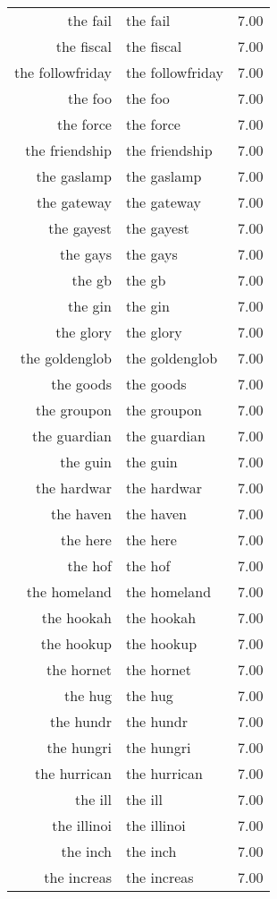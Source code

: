 \begin{table}[ht]
\begin{tabular}{rlr}
  the fail & the fail & 7.00 \\ 
  the fiscal & the fiscal & 7.00 \\ 
  the followfriday & the followfriday & 7.00 \\ 
  the foo & the foo & 7.00 \\ 
  the force & the force & 7.00 \\ 
  the friendship & the friendship & 7.00 \\ 
  the gaslamp & the gaslamp & 7.00 \\ 
  the gateway & the gateway & 7.00 \\ 
  the gayest & the gayest & 7.00 \\ 
  the gays & the gays & 7.00 \\ 
  the gb & the gb & 7.00 \\ 
  the gin & the gin & 7.00 \\ 
  the glory & the glory & 7.00 \\ 
  the goldenglob & the goldenglob & 7.00 \\ 
  the goods & the goods & 7.00 \\ 
  the groupon & the groupon & 7.00 \\ 
  the guardian & the guardian & 7.00 \\ 
  the guin & the guin & 7.00 \\ 
  the hardwar & the hardwar & 7.00 \\ 
  the haven & the haven & 7.00 \\ 
  the here & the here & 7.00 \\ 
  the hof & the hof & 7.00 \\ 
  the homeland & the homeland & 7.00 \\ 
  the hookah & the hookah & 7.00 \\ 
  the hookup & the hookup & 7.00 \\ 
  the hornet & the hornet & 7.00 \\ 
  the hug & the hug & 7.00 \\ 
  the hundr & the hundr & 7.00 \\ 
  the hungri & the hungri & 7.00 \\ 
  the hurrican & the hurrican & 7.00 \\ 
  the ill & the ill & 7.00 \\ 
  the illinoi & the illinoi & 7.00 \\ 
  the inch & the inch & 7.00 \\ 
  the increas & the increas & 7.00 \\ 

\end{tabular}
\end{table}

